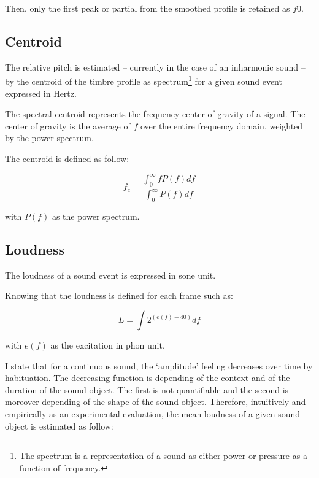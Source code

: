 Then, only the first peak or partial from the smoothed profile is retained as $f0$.

\subsection{Centroid}

The relative pitch is estimated -- currently in the case of an inharmonic sound -- by the centroid of the timbre profile as spectrum\footnote{The spectrum is a representation of a sound as either power or pressure as a function of frequency.} for a given sound event expressed in Hertz.

\smallskip

The spectral centroid represents the frequency center of gravity of a signal. The center of gravity is the average of $f$ over the entire frequency domain, weighted by the power spectrum. 

\smallskip

The centroid is defined as follow:

\begin{equation}
f_c=\frac{\displaystyle \int_0^\infty f P(f) df}{\displaystyle  \int_0^\infty P(f) df} \nonumber
\end{equation}

with $P(f)$ as the power spectrum.

\subsection{Loudness}

The loudness of a sound event is expressed in sone unit. 

\smallskip

Knowing that the loudness is defined for each frame such as:

\begin{equation}
L = \int 2^{(e(f)-40)} df \nonumber
\end{equation}

with $e(f)$ as the excitation in phon unit.

\smallskip

I state that for a continuous sound, the `amplitude' feeling decreases over time by habituation. The decreasing function is depending of the context and of the duration of the sound object. The first is not quantifiable and the second is moreover depending of the shape of the sound object. Therefore, intuitively and empirically as an experimental evaluation, the mean loudness of a given sound object is estimated as follow:

